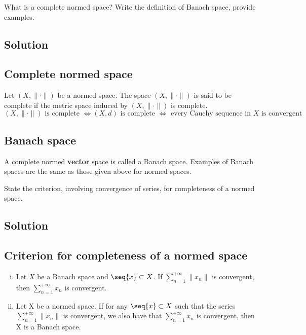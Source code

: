 
\question
What is a complete normed space? Write the definition of Banach space, provide examples.

\subsection*{Solution}

\subsection{Complete normed space}
Let $(X, \| \cdot \|)$ be a normed space. The space $(X, \| \cdot \|)$ is said to be complete if the metric space induced by $(X, \| \cdot \|)$ is complete.
\[ (X, \|\cdot\|) \text{ is complete } \iff (X, d) \text{ is complete } \iff \text{ every Cauchy sequence in } X \text{ is convergent} \]

\subsection{Banach space}
A complete normed \textbf{vector} space is called a Banach space. Examples of Banach spaces are the same as those given above for normed spaces.


\question
State the criterion, involving convergence of series, for completeness of a normed space.

\subsection*{Solution}

\subsection{Criterion for completeness of a normed space} \label{Series CriterionForComplete}
\begin{enumerate}[i)]
    \item Let $X$ be a Banach space and $\seq{x} \subset X$. If $\sum^{+\infty}_{n=1} \|x_n\|$ is convergent, then $\sum^{+\infty}_{n=1} x_n$ is convergent.
    \item Let X be a normed space. If for any $\seq{x} \subset X$ such that the series $\sum^{+\infty}_{n=1} \| x_n \|$ is convergent, we also have that $\sum_{n=1}^{+\infty} x_n$ is convergent, then X is a Banach space.
\end{enumerate}

